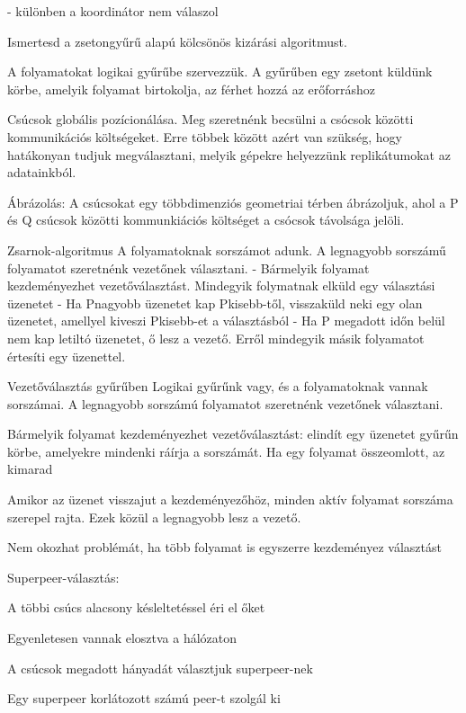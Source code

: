 \documentclass[12pt]{article}
\begin{document}
\begin{description}
        - különben a koordinátor nem válaszol
    \item  Ismertesd a zsetongyűrű alapú kölcsönös kizárási algoritmust.
    \item A folyamatokat logikai gyűrűbe szervezzük. A gyűrűben egy zsetont küldünk körbe, amelyik folyamat birtokolja,
        az férhet hozzá az erőforráshoz
    \item  Csúcsok globális pozícionálása. Meg szeretnénk becsülni a csócsok közötti kommunikációs költségeket. Erre többek között azért van szükség, hogy hatákonyan
        tudjuk megválasztani, melyik gépekre helyezzünk replikátumokat az adatainkból.
    \item Ábrázolás: A csúcsokat egy többdimenziós geometriai térben ábrázoljuk, ahol a P és Q csúcsok közötti kommunkiációs költséget a csócsok távolsága jelöli.
    \item  Zsarnok-algoritmus
        A folyamatoknak sorszámot adunk. A legnagyobb sorszámű folyamatot szeretnénk vezetőnek választani.
        - Bármelyik folyamat kezdeményezhet vezetőválasztást. Mindegyik folymatnak elküld egy választási üzenetet
        - Ha Pnagyobb üzenetet kap Pkisebb-től, visszaküld neki egy olan üzenetet, amellyel kiveszi Pkisebb-et a választásból
        - Ha P megadott időn belül nem kap letiltó üzenetet, ő lesz a vezető. Erről mindegyik másik folyamatot értesíti egy üzenettel.
    \item  Vezetőválasztás gyűrűben
        Logikai gyűrűnk vagy, és a folyamatoknak vannak sorszámai. A legnagyobb sorszámú folyamatot szeretnénk vezetőnek választani.
    \item Bármelyik folyamat kezdeményezhet vezetőválasztást: elindít egy üzenetet gyűrűn körbe, amelyekre mindenki ráírja a sorszámát.
        Ha egy folyamat összeomlott, az kimarad
    \item Amikor az üzenet visszajut a kezdeményezőhöz, minden aktív folyamat sorszáma szerepel rajta. Ezek közül a legnagyobb lesz a vezető.
    \item Nem okozhat problémát, ha több folyamat is egyszerre kezdeményez választást	
    \item  Superpeer-választás:
    \item A többi csúcs alacsony késleltetéssel éri el őket
    \item Egyenletesen vannak elosztva a hálózaton
    \item A csúcsok megadott hányadát választjuk superpeer-nek
    \item Egy superpeer korlátozott számú peer-t szolgál ki

\end{description}
\end{document}
